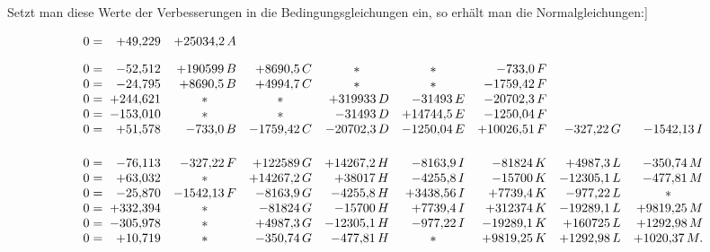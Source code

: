 Setzt man diese Werte der Verbesserungen in die Bedingungsgleichungen ein,
so erhält man die Normalgleichungen:]

\begin{landscape}
\begingroup
\setlength{\arraycolsep}{2.5pt}
\renewcommand{\arraystretch}{1.45}
\[
\begin{array}{r@{\;}r*{7}{r}}
0={} & +49{,}229 & +25034{,}2\,A & & & & & &\\[1em]
0={} & -52{,}512 & +190599\,B & +8690{,}5\,C & \multicolumn{1}{c}{\ast} & \multicolumn{1}{c}{\ast} & -733{,}0\,F & &\\
0={} & -24{,}795 & +8690{,}5\,B & +4994{,}7\,C & \multicolumn{1}{c}{\ast} & \multicolumn{1}{c}{\ast} & -1759{,}42\,F & &\\
0={} & +244{,}621 & \multicolumn{1}{c}{\ast} & \multicolumn{1}{c}{\ast} & +319933\,D & -31493\,E & -20702{,}3\,F & &\\
0={} & -153{,}010 & \multicolumn{1}{c}{\ast} & \multicolumn{1}{c}{\ast} & -31493\,D & +14744{,}5\,E & -1250{,}04\,F & &\\
0={} & +51{,}578 & -733{,}0\,B & -1759{,}42\,C & -20702{,}3\,D & -1250{,}04\,E & +10026{,}51\,F & -327{,}22\,G & -1542{,}13\,I
\\[1.5em]
0={} & -76{,}113 & -327{,}22\,F & +122589\,G & +14267{,}2\,H & -8163{,}9\,I & -81824\,K & +4987{,}3\,L & -350{,}74\,M\\
0={} & +63{,}032 & \multicolumn{1}{c}{\ast} & +14267{,}2\,G & +38017\,H & -4255{,}8\,I & -15700\,K & -12305{,}1\,L & -477{,}81\,M\\
0={} & -25{,}870 & -1542{,}13\,F & -8163{,}9\,G & -4255{,}8\,H & +3438{,}56\,I & +7739{,}4\,K & -977{,}22\,L & \multicolumn{1}{c}{\ast}\\
0={} & +332{,}394 & \multicolumn{1}{c}{\ast} & -81824\,G & -15700\,H & +7739{,}4\,I & +312374\,K & -19289{,}1\,L & +9819{,}25\,M\\
0={} & -305{,}978 & \multicolumn{1}{c}{\ast} & +4987{,}3\,G & -12305{,}1\,H & -977{,}22\,I & -19289{,}1\,K & +160725\,L & +1292{,}98\,M\\
0={} & +10{,}719 & \multicolumn{1}{c}{\ast} & -350{,}74\,G & -477{,}81\,H & \multicolumn{1}{c}{\ast} & +9819{,}25\,K & +1292{,}98\,L & +1020{,}37\,M.
\end{array}
\]
\endgroup
\end{landscape}
